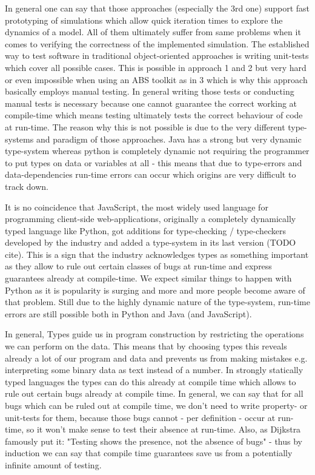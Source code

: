 In general one can say that those approaches (especially the 3rd one) support fast prototyping of simulations which allow quick iteration times to explore the dynamics of a model. All of them ultimately suffer from same problems when it comes to verifying the correctness of the implemented simulation. The established way to test software in traditional object-oriented approaches is writing unit-tests which cover all possible cases. This is possible in approach 1 and 2 but very hard or even impossible when using an ABS toolkit as in 3 which is why this approach basically employs manual testing. In general writing those tests or conducting manual tests is necessary because one cannot guarantee the correct working at compile-time which means testing ultimately tests the correct behaviour of code at run-time. The reason why this is not possible is due to the very different type-systems and paradigm of those approaches. Java has a strong but very dynamic type-system whereas python is completely dynamic not requiring the programmer to put types on data or variables at all - this means that due to type-errors and data-dependencies run-time errors can occur which origins are very difficult to track down.

It is no coincidence that JavaScript, the most widely used language for programming client-side web-applications, originally a completely dynamically typed language like Python, got additions for type-checking / type-checkers developed by the industry and added a type-system in its last version (TODO cite). This is a sign that the industry acknowledges types as something important as they allow to rule out certain classes of bugs at run-time and express guarantees already at compile-time. We expect similar things to happen with Python as it is popularity is surging and more and more people become aware of that problem. Still due to the highly dynamic nature of the type-system, run-time errors are still possible both in Python and Java (and JavaScript). 

In general, Types guide us in program construction by restricting the operations we can perform on the data. This means that by choosing types this reveals already a lot of our program and data and prevents us from making mistakes e.g. interpreting some binary data as text instead of a number. In strongly statically typed languages the types can do this already at compile time which allows to rule out certain bugs already at compile time. In general, we can say that for all bugs which can be ruled out at compile time, we don't need to write property- or unit-tests for them, because those bugs cannot - per definition - occur at run-time, so it won't make sense to test their absence at run-time. Also, as Dijkstra famously put it: "Testing shows the presence, not the absence of bugs" - thus by induction we can say that compile time guarantees save us from a potentially infinite amount of testing.

